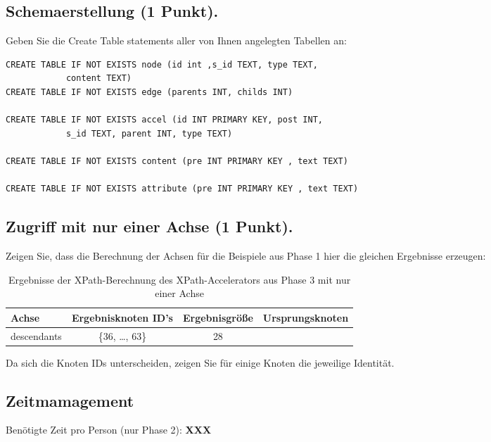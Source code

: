 \documentclass[11pt]{scrartcl}
\begin{document}
\subsection*{Schemaerstellung (1 Punkt).}
Geben Sie die Create Table statements aller von Ihnen angelegten Tabellen an:
\begin{lstlisting}[style=dmrsql]
CREATE TABLE IF NOT EXISTS node (id int ,s_id TEXT, type TEXT,
			content TEXT)
CREATE TABLE IF NOT EXISTS edge (parents INT, childs INT)

CREATE TABLE IF NOT EXISTS accel (id INT PRIMARY KEY, post INT,
			s_id TEXT, parent INT, type TEXT)

CREATE TABLE IF NOT EXISTS content (pre INT PRIMARY KEY , text TEXT)

CREATE TABLE IF NOT EXISTS attribute (pre INT PRIMARY KEY , text TEXT)
\end{lstlisting}

\subsection*{Zugriff mit nur einer Achse (1 Punkt).}
Zeigen Sie, dass die Berechnung der Achsen für die Beispiele aus Phase 1 hier die gleichen Ergebnisse erzeugen:

\begin{table}[h]
	\centering
		\begin{center}
			\begin{tabular}{ l | c c }
				\toprule
				Achse & Ergebnisknoten ID's & Ergebnisgröße & Ursprungsknoten\\
				\midrule
				descendants & \{36, \ldots, 63\} & 28 \\
				\bottomrule
			\end{tabular}
			\end{center}
	\caption{Ergebnisse der XPath-Berechnung des XPath-Accelerators aus Phase 3 mit nur einer Achse}
	\label{tab:ErgebnisseDerXPathBerechnug2}
\end{table}

Da sich die Knoten IDs unterscheiden, zeigen Sie für einige Knoten die jeweilige Identität.

\subsection*{Zeitmamagement}

Benötigte Zeit pro Person (nur Phase 2): \textbf{XXX}
\end{document}
